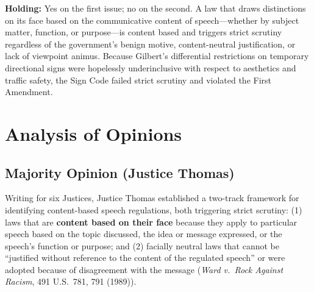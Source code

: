 \documentclass[12pt]{article}
\begin{document}
\textbf{Holding:} Yes on the first issue; no on the second. A law that draws distinctions on its face based on the communicative content of speech---whether by subject matter, function, or purpose---is content based and triggers strict scrutiny regardless of the government's benign motive, content-neutral justification, or lack of viewpoint animus. Because Gilbert's differential restrictions on temporary directional signs were hopelessly underinclusive with respect to aesthetics and traffic safety, the Sign Code failed strict scrutiny and violated the First Amendment.

\section{Analysis of Opinions}
\subsection{Majority Opinion (Justice Thomas)}

Writing for six Justices, Justice Thomas established a two-track framework for identifying content-based speech regulations, both triggering strict scrutiny: (1) laws that are \textbf{content based on their face} because they apply to particular speech based on the topic discussed, the idea or message expressed, or the speech's function or purpose; and (2) facially neutral laws that cannot be ``justified without reference to the content of the regulated speech'' or were adopted because of disagreement with the message (\textit{Ward v.\ Rock Against Racism}, 491 U.S.\ 781, 791 (1989)).
\end{document}
